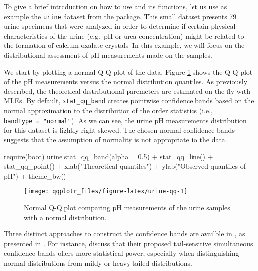 To give a brief introduction on how to use  and its
functions, let us use as example the \texttt{urine} dataset from the
 package. This small dataset presents 79 urine specimens that
were analyzed in order to determine if certain physical characteristics
of the urine (e.g.~pH or urea concentration) might be related to the
formation of calcium oxalate crystals. In this example, we will focus on
the distributional assessment of pH measurements made on the samples.

We start by plotting a normal Q-Q plot of the data. Figure
\ref{fig:urine-qq} shows the Q-Q plot of the pH measurements versus the
normal distribution quantiles. As previously described, the theoretical
distributional paremeters are estimated on the fly with MLEs. By
default, \texttt{stat\_qq\_band} creates pointwise confidence bands
based on the normal approximation to the distribution of the order
statistics (i.e., \texttt{bandType\ =\ "normal"}). As we can see, the
urine pH measurements distribution for this dataset is lightly
right-skewed. The chosen normal confidence bands suggests that the
assumption of normality is not appropriate to the data.

\begin{Schunk}
\begin{Sinput}
require(boot)
urine %>% ggplot(aes(sample = ph)) + 
  stat_qq_band(alpha = 0.5) + 
  stat_qq_line() + 
  stat_qq_point() +
  xlab("Theoretical quantiles") +
  ylab("Observed quantiles of pH") +
  theme_bw()
\end{Sinput}
\begin{figure}

{\centering \texttt{[image: qqplotr\_files/figure-latex/urine-qq-1]} 

}

\caption[Normal Q-Q plot comparing pH measurements of the urine samples with a normal distribution]{Normal Q-Q plot comparing pH measurements of the urine samples with a normal distribution.}\label{fig:urine-qq}
\end{figure}
\end{Schunk}

\FloatBarrier

Three distinct approaches to construct the confidence bands are availble
in , as presented in . For
instance, \citet{Aldor-Noiman2013-xw} discuss that their proposed
tail-sensitive simultaneous confidence bands offers more statistical
power, especially when distinguishing normal distributions from mildy or
heavy-tailed distributions.

